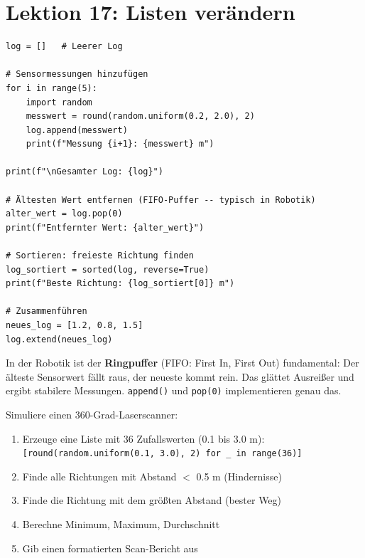\section{Lektion 17: Listen verändern}

\begin{lstlisting}
log = []   # Leerer Log

# Sensormessungen hinzufügen
for i in range(5):
    import random
    messwert = round(random.uniform(0.2, 2.0), 2)
    log.append(messwert)
    print(f"Messung {i+1}: {messwert} m")

print(f"\nGesamter Log: {log}")

# Ältesten Wert entfernen (FIFO-Puffer -- typisch in Robotik)
alter_wert = log.pop(0)
print(f"Entfernter Wert: {alter_wert}")

# Sortieren: freieste Richtung finden
log_sortiert = sorted(log, reverse=True)
print(f"Beste Richtung: {log_sortiert[0]} m")

# Zusammenführen
neues_log = [1.2, 0.8, 1.5]
log.extend(neues_log)
\end{lstlisting}

\begin{praxis}
In der Robotik ist der \textbf{Ringpuffer} (FIFO: First In, First Out) fundamental: Der älteste Sensorwert fällt raus, der neueste kommt rein. Das glättet Ausreißer und ergibt stabilere Messungen. \texttt{append()} und \texttt{pop(0)} implementieren genau das.
\end{praxis}

\begin{uebung}[title=Projektaufgabe Modul 5: Laserscanner-Auswertung]
Simuliere einen 360-Grad-Laserscanner:
\begin{enumerate}
    \item Erzeuge eine Liste mit 36 Zufallswerten (0.1 bis 3.0 m): \texttt{[round(random.uniform(0.1, 3.0), 2) for \_ in range(36)]}
    \item Finde alle Richtungen mit Abstand $<$ 0.5 m (Hindernisse)
    \item Finde die Richtung mit dem größten Abstand (bester Weg)
    \item Berechne Minimum, Maximum, Durchschnitt
    \item Gib einen formatierten Scan-Bericht aus
\end{enumerate}
\end{uebung}
